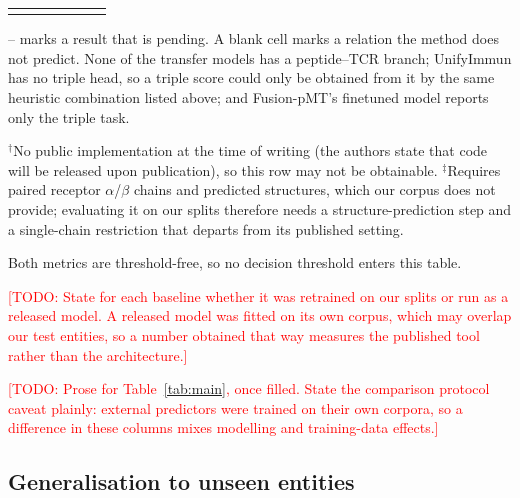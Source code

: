 \documentclass[webpdf,modern,large,namedate]{oup-authoring-template}
\theoremstyle{thmstyleone}
\theoremstyle{thmstyletwo}
\theoremstyle{thmstylethree}
\newcommand{\NA}{--}
\DeclareRobustCommand{\TODO}[1]{\textcolor{red}{[TODO: #1]}}
\begin{document}
\begin{table}[!t]
\begin{tabular*}{\textwidth}{@{\extracolsep{\fill}}lcccccc@{\extracolsep{\fill}}}
\botrule
\end{tabular*}
\begin{tablenotes}%
\item \NA{} marks a result that is pending. A blank cell marks a relation the
method does not predict. None of the transfer models has a peptide--TCR branch;
UnifyImmun has no triple head, so a triple score could only be obtained from it
by the same heuristic combination listed above; and Fusion-pMT's finetuned
model reports only the triple task.
\item $^{\dag}$No public implementation at the time of writing (the authors
state that code will be released upon publication), so this row may not be
obtainable. $^{\ddag}$Requires paired receptor $\alpha$/$\beta$ chains and
predicted structures, which our corpus does not provide; evaluating it on our
splits therefore needs a structure-prediction step and a single-chain
restriction that departs from its published setting.
\item Both metrics are threshold-free, so no decision threshold enters this
table.
\item \TODO{State for each baseline whether it was retrained on our splits or
run as a released model. A released model was fitted on its own corpus, which
may overlap our test entities, so a number obtained that way measures the
published tool rather than the architecture.}
\end{tablenotes}
\end{table}

\TODO{Prose for Table~\ref{tab:main}, once filled. State the comparison
protocol caveat plainly: external predictors were trained on their own corpora,
so a difference in these columns mixes modelling and training-data effects.}

\subsection{Generalisation to unseen entities}\label{sec:results:unseen}
\end{document}
